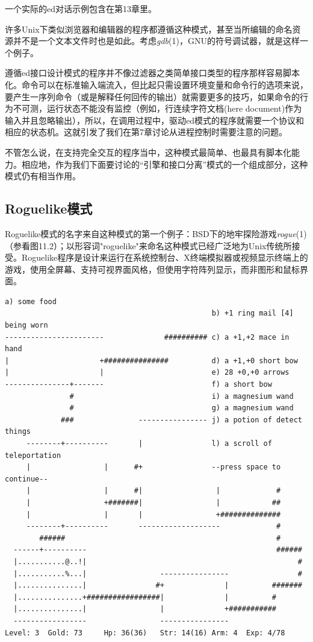 \documentclass[12pt,oneside]{book}
\begin{document}
一个实际的ed对话示例包含在第13章里。

许多Unix下类似浏览器和编辑器的程序都遵循这种模式，甚至当所编辑的命名资源并不是一个文本文件时也是如此。考虑\textit{gdb}(1)，GNU的符号调试器，就是这样一个例子。

遵循ed接口设计模式的程序并不像过滤器之类简单接口类型的程序那样容易脚本化。命令可以在标准输入端流入，但比起只需设置环境变量和命令行的选项来说，要产生一序列命令（或是解释任何回传的输出）就需要更多的技巧，如果命令的行为不可测，运行状态不能没有监控（例如，行连续字符文档(here document)作为输入并且忽略输出），所以，在调用过程中，驱动ed模式的程序就需要一个协议和相应的状态机。这就引发了我们在第7章讨论从进程控制时需要注意的问题。

不管怎么说，在支持完全交互的程序当中，这种模式最简单、也最具有脚本化能力。相应地，作为我们下面要讨论的“引擎和接口分离”模式的一个组成部分，这种模式仍有相当作用。


\subsection{Roguelike模式}
Roguelike模式的名字来自这种模式的第一个例子：BSD下的地牢探险游戏\textit{rogue}(1)（参看图11.2）；以形容词"roguelike"来命名这种模式已经广泛地为Unix传统所接受。Roguelike程序是设计来运行在系统控制台、X终端模拟器或视频显示终端上的游戏，使用全屏幕、支持可视界面风格，但使用字符阵列显示，而非图形和鼠标界面。

\begin{Verbatim}[label=图11.2 Rogue游戏最初版的屏幕截图]
                                                a) some food
                                                b) +1 ring mail [4] being worn
-----------------------              ########## c) a +1,+2 mace in hand 
|                     +###############          d) a +1,+0 short bow
|                     |                         e) 28 +0,+0 arrows
---------------+-------                         f) a short bow
               #                                i) a magnesium wand
               #                                g) a magnesium wand
             ###               ---------------- j) a potion of detect things
     --------+----------       |                l) a scroll of teleportation
     |                 |      #+                --press space to continue--
     |                 |      #|                 |             #
     |                 +#######|                 |            ##
     |                 |       |                 +##############
     --------+----------       -------------------             #
        ######                                                 #
  ------+----------                                            ######
  |...........@..!|                                                 #
  |...........%...|                 ----------------                #
  |...............|                #+              |          #######
  |...............+#################|              |          #
  |...............|                 |              +###########
  -----------------                 ----------------
Level: 3  Gold: 73     Hp: 36(36)   Str: 14(16) Arm: 4  Exp: 4/78
\end{Verbatim}
\end{document}
